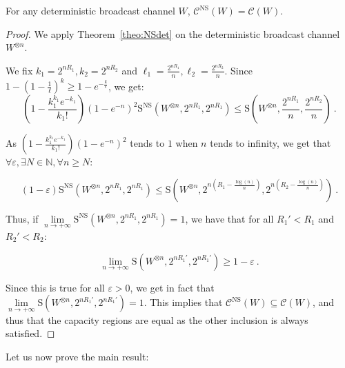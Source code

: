 \begin{cor}
  \label{cor:NSdet}
  For any deterministic broadcast channel $W$, $\mathcal{C}^{\mathrm{NS}}(W)=\mathcal{C}(W)$.
\end{cor}
\begin{proof}
  We apply Theorem~\ref{theo:NSdet} on the deterministic broadcast channel $W^{\otimes n}$.

  We fix $k_1=2^{nR_1},k_2=2^{nR_2}$ and $\ell_1=\frac{2^{nR_1}}{n},\ell_2=\frac{2^{nR_2}}{n}$. Since $1-\left(1-\frac{1}{\ell}\right)^{k} \geq 1-e^{-\frac{k}{\ell}}$, we get:
\[ \left(1 - \frac{k_1^{k_1}e^{-k_1}}{k_1!}\right)\left(1-e^{-n}\right)^2\mathrm{S}^{\mathrm{NS}}(W^{\otimes n},2^{nR_1},2^{nR_1}) \leq \mathrm{S}\left(W^{\otimes n},\frac{2^{nR_1}}{n},\frac{2^{nR_2}}{n}\right)\ . \]

  As $\left(1 - \frac{k_1^{k_1}e^{-k_1}}{k_1!}\right)\left(1-e^{-n}\right)^2$ tends to $1$ when $n$ tends to infinity, we get that $\forall \varepsilon, \exists N \in \mathbb{N}, \forall n\geq N$:

\[ (1-\varepsilon)\mathrm{S}^{\mathrm{NS}}(W^{\otimes n},2^{nR_1},2^{nR_1}) \leq \mathrm{S}(W^{\otimes n},2^{n(R_1-\frac{\log(n)}{n})},2^{n(R_2-\frac{\log(n)}{n})}) \ . \]

Thus, if $\underset{n \rightarrow +\infty}{\lim} \mathrm{S}^{\mathrm{NS}}(W^{\otimes n},2^{nR_1},2^{nR_1})  = 1$, we have that for all $R_1'<R_1$ and $R_2'<R_2$:

\[ \underset{n \rightarrow +\infty}{\lim} \mathrm{S}(W^{\otimes n},2^{nR_1'},2^{nR_1'}) \geq 1-\varepsilon \ . \]

Since this is true for all $\varepsilon > 0$, we get in fact that $\underset{n \rightarrow +\infty}{\lim} \mathrm{S}(W^{\otimes n},2^{nR_1'},2^{nR_1'}) = 1$. This implies that $\mathcal{C}^{\mathrm{NS}}(W) \subseteq \mathcal{C}(W)$, and thus that the capacity regions are equal as the other inclusion is always satisfied.

\end{proof}

Let us now prove the main result:


